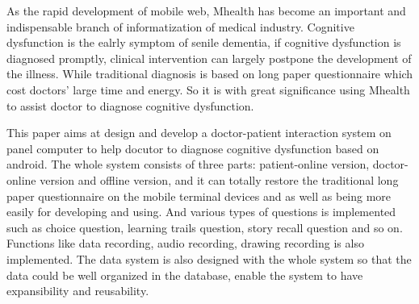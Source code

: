 
\begin{eabstract} 
As the rapid development of mobile web, Mhealth has become an important and indispensable branch of informatization of medical industry. Cognitive dysfunction is the ealrly symptom of senile dementia, if cognitive dysfunction is diagnosed promptly, clinical intervention can largely postpone the development of the illness. While traditional diagnosis is based on long paper questionnaire which cost doctors' large time and energy. So it is with great significance using Mhealth to assist doctor to diagnose cognitive dysfunction.

This paper aims at design and develop a doctor-patient interaction system on panel computer to help docutor to diagnose cognitive dysfunction based on android. The whole system consists of three parts: patient-online version, doctor-online version and offline version, and it can totally restore the traditional long paper questionnaire on the mobile terminal devices and as well as being more easily for developing and using. And various types of questions is implemented such as choice question, learning trails question, story recall question and so on. Functions like data recording, audio recording, drawing recording is also implemented. The data system is also designed with the whole system so that the data could be well organized in the database, enable the system to have expansibility and reusability.
\end{eabstract}

